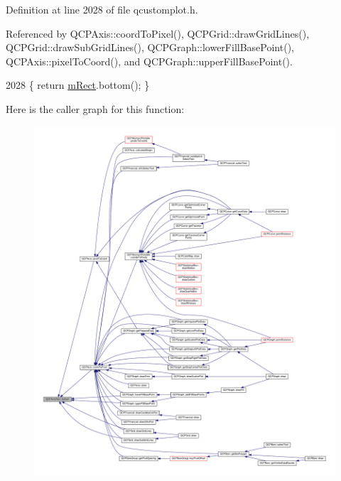 Definition at line 2028 of file qcustomplot.\+h.



Referenced by Q\+C\+P\+Axis\+::coord\+To\+Pixel(), Q\+C\+P\+Grid\+::draw\+Grid\+Lines(), Q\+C\+P\+Grid\+::draw\+Sub\+Grid\+Lines(), Q\+C\+P\+Graph\+::lower\+Fill\+Base\+Point(), Q\+C\+P\+Axis\+::pixel\+To\+Coord(), and Q\+C\+P\+Graph\+::upper\+Fill\+Base\+Point().


\begin{DoxyCode}
2028 \{ \textcolor{keywordflow}{return} \hyperlink{class_q_c_p_layout_element_ad8896f05550389f7b9e92c9e6cdf6e01}{mRect}.bottom(); \}
\end{DoxyCode}


Here is the caller graph for this function\+:\nopagebreak
\begin{figure}[H]
\begin{center}
\leavevmode
\includegraphics[width=350pt]{class_q_c_p_axis_rect_af2b5982ebe7e6f781b9bf1cc371a60d8_icgraph}
\end{center}
\end{figure}


\hypertarget{class_q_c_p_axis_rect_a724b0333971ea6a338f0dbd814dc97ae}{}
